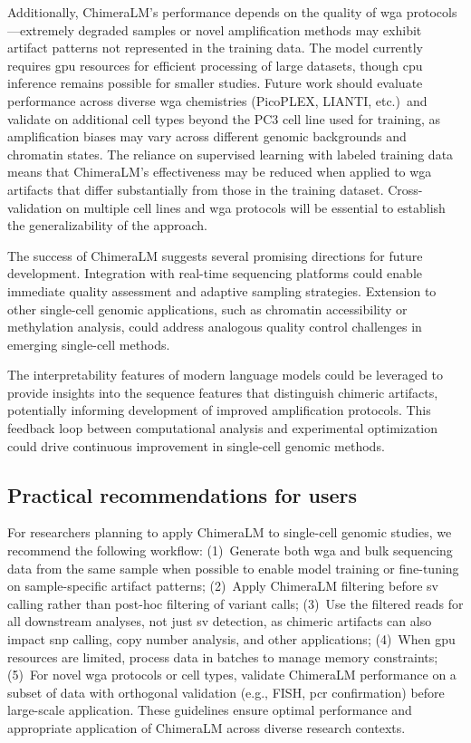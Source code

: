 \documentclass[pdflatex,sn-nature]{sn-jnl}%
\theoremstyle{thmstyleone}%
\theoremstyle{thmstyletwo}%
\theoremstyle{thmstylethree}%
\begin{document}
Additionally, ChimeraLM's performance depends on the quality of \gls{wga} protocols---extremely degraded samples or novel amplification methods may exhibit artifact patterns not represented in the training data.
The model currently requires \gls{gpu} resources for efficient processing of large datasets, though \gls{cpu} inference remains possible for smaller studies.
Future work should evaluate performance across diverse \gls{wga} chemistries (PicoPLEX, LIANTI, etc.)\ and validate on additional cell types beyond the PC3 cell line used for training, as amplification biases may vary across different genomic backgrounds and chromatin states.
The reliance on supervised learning with labeled training data means that ChimeraLM's effectiveness may be reduced when applied to \gls{wga} artifacts that differ substantially from those in the training dataset.
Cross-validation on multiple cell lines and \gls{wga} protocols will be essential to establish the generalizability of the approach.

The success of ChimeraLM suggests several promising directions for future development.
Integration with real-time sequencing platforms could enable immediate quality assessment and adaptive sampling strategies.
Extension to other single-cell genomic applications, such as chromatin accessibility or methylation analysis, could address analogous quality control challenges in emerging single-cell methods.

The interpretability features of modern language models could be leveraged to provide insights into the sequence features that distinguish chimeric artifacts, potentially informing development of improved amplification protocols.
This feedback loop between computational analysis and experimental optimization could drive continuous improvement in single-cell genomic methods.

\subsection*{Practical recommendations for users}

For researchers planning to apply ChimeraLM to single-cell genomic studies, we recommend the following workflow:
(1)~Generate both \gls{wga} and bulk sequencing data from the same sample when possible to enable model training or fine-tuning on sample-specific artifact patterns;
(2)~Apply ChimeraLM filtering before \gls{sv} calling rather than post-hoc filtering of variant calls;
(3)~Use the filtered reads for all downstream analyses, not just \gls{sv} detection, as chimeric artifacts can also impact \gls{snp} calling, copy number analysis, and other applications;
(4)~When \gls{gpu} resources are limited, process data in batches to manage memory constraints;
(5)~For novel \gls{wga} protocols or cell types, validate ChimeraLM performance on a subset of data with orthogonal validation (e.g., FISH, \gls{pcr} confirmation) before large-scale application.
These guidelines ensure optimal performance and appropriate application of ChimeraLM across diverse research contexts.
\end{document}
